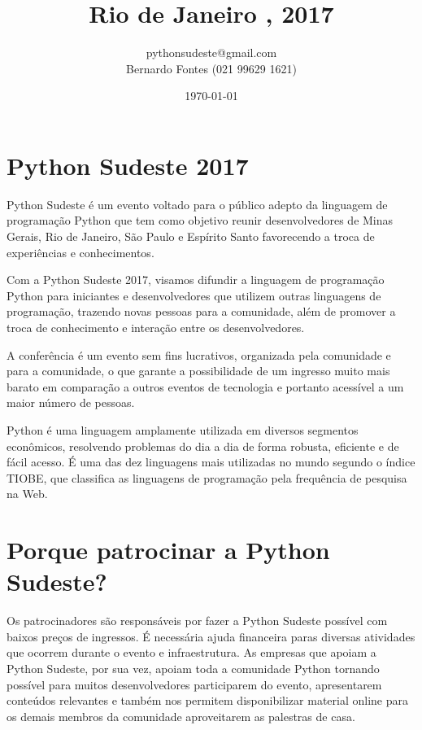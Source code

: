 \documentclass[12pt]{article}
\title{Rio de Janeiro , 2017}
\author{pythonsudeste@gmail.com \\ Bernardo Fontes (021 99629 1621)}
\date{\today}
\begin{document}
\maketitle


\section{Python Sudeste 2017}

Python Sudeste é um evento voltado para o público adepto da linguagem de programação Python que tem como objetivo reunir desenvolvedores de Minas Gerais, Rio de Janeiro, São Paulo e Espírito Santo favorecendo a troca de experiências e conhecimentos.

Com a Python Sudeste 2017, visamos difundir a linguagem de programação Python para iniciantes e desenvolvedores que utilizem outras linguagens de programação, trazendo novas pessoas para a comunidade, além de promover a troca de conhecimento e interação entre os desenvolvedores.

A conferência é um evento sem fins lucrativos, organizada pela comunidade e para a comunidade, o que garante a possibilidade de um ingresso muito mais barato em comparação a outros eventos de tecnologia e portanto acessível a um maior número de pessoas.

Python é uma linguagem amplamente utilizada em diversos segmentos econômicos, resolvendo problemas do dia a dia de forma robusta, eficiente e de fácil acesso. É uma das dez linguagens mais utilizadas no mundo segundo o índice TIOBE, que classifica as linguagens de programação pela frequência de pesquisa na Web.

\section{Porque patrocinar a Python Sudeste?}

Os patrocinadores são responsáveis por fazer a Python Sudeste possível com baixos preços de ingressos. É necessária ajuda financeira paras diversas atividades que ocorrem durante o evento e infraestrutura. As empresas que apoiam a Python Sudeste, por sua vez, apoiam toda a comunidade Python tornando possível para muitos desenvolvedores participarem do evento, apresentarem conteúdos relevantes e também nos permitem disponibilizar material online para os demais membros da comunidade aproveitarem as palestras de casa.
\end{document}
